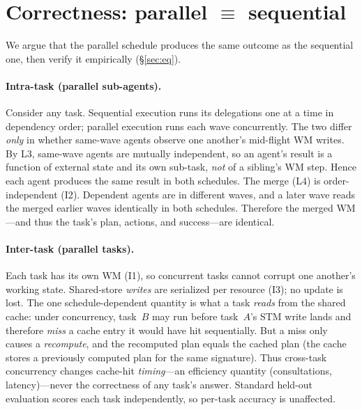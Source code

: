 \documentclass[10pt,twocolumn]{article}
\begin{document}
\section{Correctness: parallel $\equiv$ sequential}\label{sec:correct}
We argue that the parallel schedule produces the same outcome as the sequential
one, then verify it empirically (\S\ref{sec:eq}).

\paragraph{Intra-task (parallel sub-agents).}
Consider any task. Sequential execution runs its delegations one at a time in
dependency order; parallel execution runs each wave concurrently. The two differ
\emph{only} in whether same-wave agents observe one another's mid-flight WM
writes. By L3, same-wave agents are mutually independent, so an agent's result
is a function of external state and its own sub-task, \emph{not} of a sibling's
WM step. Hence each agent produces the same result in both schedules. The merge
(L4) is order-independent (\textsc{I2}). Dependent agents are in different waves,
and a later wave reads the merged earlier waves identically in both schedules.
Therefore the merged WM---and thus the task's plan, actions, and
success---are identical.

\paragraph{Inter-task (parallel tasks).}
Each task has its own WM (\textsc{I1}), so concurrent tasks cannot corrupt one
another's working state. Shared-store \emph{writes} are serialized per resource
(\textsc{I3}); no update is lost. The one schedule-dependent quantity is what a
task \emph{reads} from the shared cache: under concurrency, task~$B$ may run
before task~$A$'s STM write lands and therefore \emph{miss} a cache entry it
would have hit sequentially. But a miss only causes a \emph{recompute}, and the
recomputed plan equals the cached plan (the cache stores a previously computed
plan for the same signature). Thus cross-task concurrency changes cache-hit
\emph{timing}---an efficiency quantity (consultations, latency)---never the
correctness of any task's answer. Standard held-out evaluation scores each task
independently, so per-task accuracy is unaffected.
\end{document}
